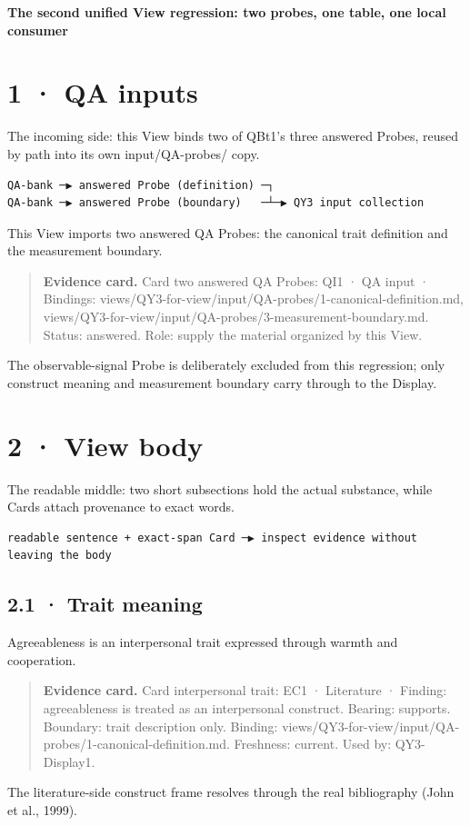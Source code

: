 \documentclass[11pt]{article}
\begin{document}
\begin{center}\LARGE\textbf{The second unified View regression: two probes, one table, one local consumer}\end{center}
\section*{1 · QA inputs}
The incoming side: this View binds two of QBt1's three answered Probes, reused by path into its own input/QA-probes/ copy.

\begin{Verbatim}[fontsize=\small]
QA-bank ─▶ answered Probe (definition) ─┐
QA-bank ─▶ answered Probe (boundary)   ─┴─▶ QY3 input collection
\end{Verbatim}
This View imports two answered QA Probes: the canonical trait definition and the measurement boundary.

\begin{quote}\footnotesize\textbf{Evidence card.} Card two answered QA Probes: QI1 · QA input · Bindings: views/QY3-for-view/input/QA-probes/1-canonical-definition.md, views/QY3-for-view/input/QA-probes/3-measurement-boundary.md. Status: answered. Role: supply the material organized by this View.\end{quote}
The observable-signal Probe is deliberately excluded from this regression; only construct meaning and measurement boundary carry through to the Display.

\section*{2 · View body}
The readable middle: two short subsections hold the actual substance, while Cards attach provenance to exact words.

\begin{Verbatim}[fontsize=\small]
readable sentence + exact-span Card ─▶ inspect evidence without leaving the body
\end{Verbatim}
\subsection*{2.1 · Trait meaning}
Agreeableness is an interpersonal trait expressed through warmth and cooperation.

\begin{quote}\footnotesize\textbf{Evidence card.} Card interpersonal trait: EC1 · Literature · Finding: agreeableness is treated as an interpersonal construct. Bearing: supports. Boundary: trait description only. Binding: views/QY3-for-view/input/QA-probes/1-canonical-definition.md. Freshness: current. Used by: QY3-Display1.\end{quote}
The literature-side construct frame resolves through the real bibliography (John et al., 1999).
\end{document}
